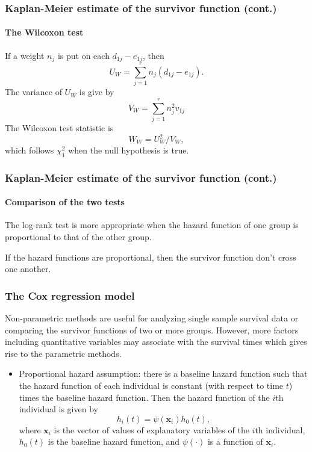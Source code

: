 \documentclass{beamer}
\begin{document}
	\begin{frame}
		\frametitle{Kaplan-Meier estimate of the survivor function (cont.)}
		\framesubtitle{The Wilcoxon test}
		If a weight $n_j$ is put on each $d_{ 1j } - e_{ 1j }$, then
		\[ U_W = \sum_{ j = 1 }^{ r } n_j( d_{ 1j } - e_{ 1j } ). \]
		The variance of $U_W$ is give by
		\[ V_W = \sum_{ j = 1 }^{ r } n_j^2 v_{ 1j } \]
		The Wilcoxon test statistic is 
		\[ W_W = U_W^2 / V_W, \]
		which follows $\chi^2_1$ when the null hypothesis is true.
	\end{frame}
	
	\begin{frame}
		\frametitle{Kaplan-Meier estimate of the survivor function (cont.)}
		\framesubtitle{Comparison of the two tests}
		The log-rank test is more appropriate when the hazard function of one group is proportional to that of the other group.
		
		If the hazard functions are proportional, then the survivor function don't cross one another.
	\end{frame}
	
	\begin{frame}
		\frametitle{The Cox regression model}
		Non-parametric methods are useful for analyzing single sample survival data or comparing the survivor functions of two or more groups. However, more factors including quantitative variables may associate with the survival times which gives rise to the parametric methods.
		\begin{itemize}
			\item Proportional hazard assumption:
			there is a baseline hazard function such that the hazard function of each individual is constant (with respect to time $t$) times the baseline hazard function.
			Then the hazard function of the $i$th individual is given by
			\[ h_i( t ) = \psi( \boldsymbol{ x }_i )h_0( t ), \]
			where $\boldsymbol{ x }_i$ is the vector of values of explanatory variables of the $i$th individual, $h_0( t )$ is the baseline hazard function, and $\psi( \cdot )$ is a function of $\boldsymbol{ x }_i$.  
		\end{itemize}
	\end{frame}
	
	\begin{frame}[allowframebreaks]
		\begin{singlespace}
			
			
		\end{singlespace}
	\end{frame}
\end{document}
